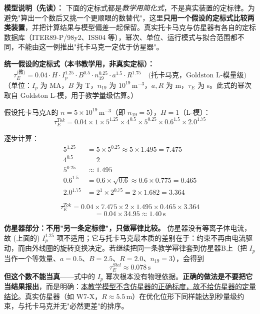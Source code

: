 \textbf{模型说明（先读）：} 下面的定标式都是\emph{教学用简化式}，不是真实装置的定标律。为避免"算出一个数后又挑一个更顺眼的数替代"，这里\textbf{只用一个假设的定标式比较两类装置}，并把计算结果与模型偏差一起保留。真实托卡马克与仿星器有各自的定标数据库（ITER89-P/98y2、ISS04 等），幂次、单位、运行模式与拟合范围都不同，不能由这一例推出"托卡马克一定优于仿星器"。

\textbf{统一假设的定标式（本书教学用，非真实定标）：}
\begin{equation}
    \tau_E^{\text{(教)}} = 0.04 \cdot H \cdot I_p^{1.25} \cdot B^{0.5} \cdot n_{19}^{0.25} \cdot a^{1.5} \cdot R^{1.75}\quad\text{(托卡马克，Goldston L-模量级)}
    \label{eq:ch10-tokamak-scaling}
\end{equation}
（单位：$I_p$ 为 MA，$B$ 为 T，$n_{19}$ 为 $10^{19}\,\mathrm{m^{-3}}$，$a,R$ 为 m，$\tau_E$ 为 s。此式的幂次取自 Goldston L-模，用于教学量级估算。）

假设托卡马克A的 $n=5\times10^{19}\,\mathrm{m^{-3}}$（即 $n_{19}=5$），$H=1$（L-模）：
\[
    \tau_E^{Tok} = 0.04 \times 1 \times 5^{1.25} \times 4^{0.5} \times 5^{0.25} \times 0.6^{1.5} \times 2.0^{1.75}
\]

逐步计算：
\begin{align*}
    5^{1.25} &= 5 \times 5^{0.25} \approx 5 \times 1.495 = 7.475 \\
    4^{0.5} &= 2 \\
    5^{0.25} &\approx 1.495 \\
    0.6^{1.5} &= 0.6\times\sqrt{0.6} \approx 0.6\times0.775 = 0.465 \\
    2.0^{1.75} &= 2^1 \times 2^{0.75} = 2 \times 1.682 = 3.364
\end{align*}

\[
    \tau_E^{Tok} = 0.04 \times 7.475 \times 2 \times 1.495 \times 0.465 \times 3.364
\]
\[
    = 0.04 \times 34.95 \approx 1.40\,\mathrm{s}
\]

\textbf{仿星器部分：不用"另一条定标律"，只做幂律比较。} 仿星器没有等离子体电流，故 (上面的) $I_p^{1.25}$ 项不适用；它与托卡马克最本质的差别在于：约束不再由电流驱动，而由外线圈的旋转变换决定。若继续把同一条教学幂律套到仿星器B上（把 $I_p$ 当作一个等效量、$a=0.5$、$B=2.5$、$R=2.0$、$n_{19}=3$），会得到
\[
    \tau_E^{Stel} \approx 0.078\,\mathrm{s}
\]
\textbf{但这个数不能当真}——式中的 $I_p$ 幂次根本没有物理依据。\textbf{正确的做法是不要把它当结果报出}，而是明确：\underline{本教学模型不含仿星器的正确标度，故不给仿星器的定量结论}。真实仿星器（如 W7-X，$R\approx5.5\,\mathrm{m}$）在优化位形下同样能达到秒量级约束，与托卡马克并无"必然更差"的排序。

